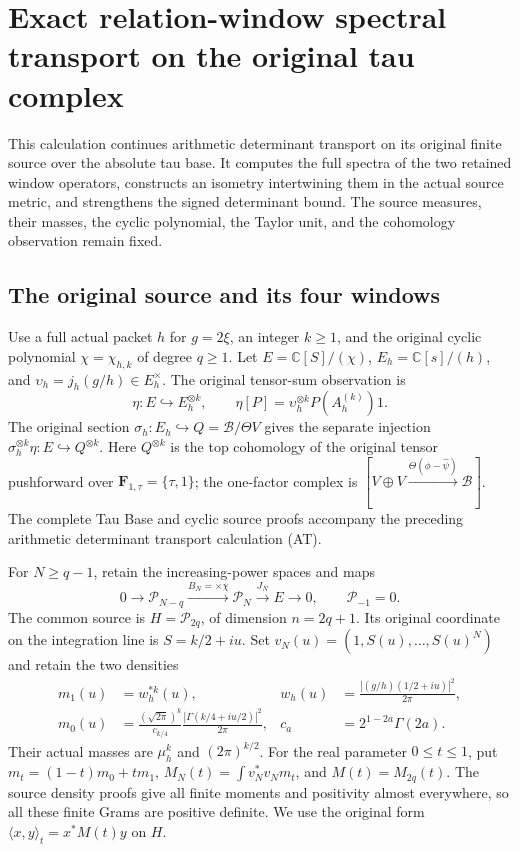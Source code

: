 \begingroup
\def\C{\mathbb C}
\def\Tr{\operatorname{Tr}}
\def\cP{\mathcal P}
\section{Exact relation-window spectral transport on the original tau complex}
This calculation continues arithmetic determinant transport on its original
finite source over the absolute tau base. It computes the full spectra of
the two retained window operators, constructs an isometry intertwining
them in the actual source metric, and strengthens the signed determinant
bound. The source measures, their masses, the cyclic polynomial, the
Taylor unit, and the cohomology observation remain fixed.

\subsection{The original source and its four windows}

Use a full actual packet $h$ for $g=2\xi$, an integer $k\ge1$, and the
original cyclic polynomial $\chi=\chi_{h,k}$ of degree $q\ge1$.
Let $E=\C[S]/(\chi)$, $E_h=\C[s]/(h)$, and
$\upsilon_h=j_h(g/h)\in E_h^\times$.
The original tensor-sum observation is
\[
 \eta:E\hookrightarrow E_h^{\otimes k},\qquad
 \eta[P]=\upsilon_h^{\otimes k}P(A_h^{(k)})1.
 \tag{AW1}
\]
The original section $\sigma_h:E_h\hookrightarrow
Q=\mathscr B/\Theta V$ gives the separate injection
$\sigma_h^{\otimes k}\eta:E\hookrightarrow Q^{\otimes k}$.
Here $Q^{\otimes k}$ is the top cohomology of the original tensor
pushforward over $\mathbf F_{1,\tau}=\{\tau,1\}$; the one-factor
complex is $[V\oplus V\xrightarrow{\Theta(\phi-\widehat\psi)}
\mathscr B]$. The complete Tau Base and cyclic source proofs accompany
the preceding arithmetic determinant transport calculation (AT).

For $N\ge q-1$, retain the increasing-power spaces and maps
\[
 0\longrightarrow\cP_{N-q}\xrightarrow{B_N=\times\chi}
 \cP_N\xrightarrow{J_N}E\longrightarrow0,
 \qquad \cP_{-1}=0.
 \tag{AW2}
\]
The common source is $H=\cP_{2q}$, of dimension $n=2q+1$.
Its original coordinate on the integration line is $S=k/2+iu$.
Set $v_N(u)=(1,S(u),\ldots,S(u)^N)$ and retain the two densities
\[
 \begin{aligned}
 m_1(u)&=w_h^{*k}(u),&
 w_h(u)&=\frac{|(g/h)(1/2+iu)|^2}{2\pi},\\
 m_0(u)&=\frac{(\sqrt{2\pi})^k}{c_{k/4}}
              \frac{|\Gamma(k/4+iu/2)|^2}{2\pi},&
 c_a&=2^{1-2a}\Gamma(2a).
 \end{aligned}
 \tag{AW3}
\]
Their actual masses are $\mu_h^k$ and $(2\pi)^{k/2}$.
For the real parameter $0\le t\le1$, put
$m_t=(1-t)m_0+tm_1$, $M_N(t)=\int v_N^*v_Nm_t$, and
$M(t)=M_{2q}(t)$. The source density proofs give all finite moments
and positivity almost everywhere, so all these finite Grams are
positive definite. We use the original form
$\langle x,y\rangle_t=x^*M(t)y$ on $H$.

